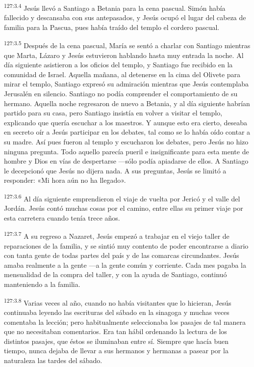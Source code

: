 \par 
\textsuperscript{127:3.4} Jesús llevó a Santiago a Betania para la cena pascual. Simón había fallecido y descansaba con sus antepasados, y Jesús ocupó el lugar del cabeza de familia para la Pascua, pues había traído del templo el cordero pascual.

\par 
\textsuperscript{127:3.5} Después de la cena pascual, María se sentó a charlar con Santiago mientras que Marta, Lázaro y Jesús estuvieron hablando hasta muy entrada la noche. Al día siguiente asistieron a los oficios del templo, y Santiago fue recibido en la comunidad de Israel. Aquella mañana, al detenerse en la cima del Olivete para mirar el templo, Santiago expresó su admiración mientras que Jesús contemplaba Jerusalén en silencio. Santiago no podía comprender el comportamiento de su hermano. Aquella noche regresaron de nuevo a Betania, y al día siguiente habrían partido para su casa, pero Santiago insistía en volver a visitar el templo, explicando que quería escuchar a los maestros. Y aunque esto era cierto, deseaba en secreto oír a Jesús participar en los debates, tal como se lo había oído contar a su madre. Así pues fueron al templo y escucharon los debates, pero Jesús no hizo ninguna pregunta. Todo aquello parecía pueril e insignificante para esta mente de hombre y Dios en vías de despertarse ---sólo podía apiadarse de ellos. A Santiago le decepcionó que Jesús no dijera nada. A sus preguntas, Jesús se limitó a responder: «Mi hora aún no ha llegado».

\par 
\textsuperscript{127:3.6} Al día siguiente emprendieron el viaje de vuelta por Jericó y el valle del Jordán. Jesús contó muchas cosas por el camino, entre ellas su primer viaje por esta carretera cuando tenía trece años.

\par 
\textsuperscript{127:3.7} A su regreso a Nazaret, Jesús empezó a trabajar en el viejo taller de reparaciones de la familia, y se sintió muy contento de poder encontrarse a diario con tanta gente de todas partes del país y de las comarcas circundantes. Jesús amaba realmente a la gente ---a la gente común y corriente. Cada mes pagaba la mensualidad de la compra del taller, y con la ayuda de Santiago, continuó manteniendo a la familia.

\par 
\textsuperscript{127:3.8} Varias veces al año, cuando no había visitantes que lo hicieran, Jesús continuaba leyendo las escrituras del sábado en la sinagoga y muchas veces comentaba la lección; pero habitualmente seleccionaba los pasajes de tal manera que no necesitaban comentarios. Era tan hábil ordenando la lectura de los distintos pasajes, que éstos se iluminaban entre sí. Siempre que hacía buen tiempo, nunca dejaba de llevar a sus hermanos y hermanas a pasear por la naturaleza las tardes del sábado.

